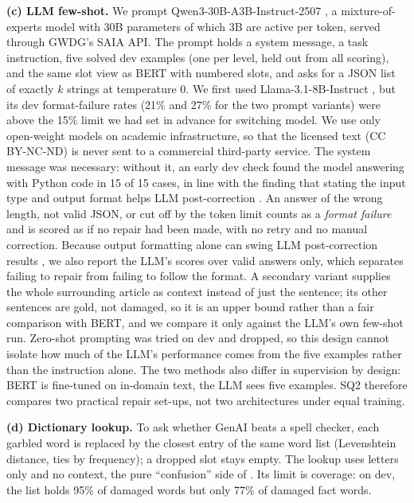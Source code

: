 \textbf{(c) LLM few-shot.} We prompt Qwen3-30B-A3B-Instruct-2507 \citep{yang2025qwen3}, a mixture-of-experts model
with 30B parameters of which 3B are active per token, served through GWDG's SAIA API. The prompt holds a system
message, a task instruction, five solved dev examples (one per level, held out from all scoring), and the same slot
view as BERT with numbered slots, and asks for a JSON list of exactly $k$ strings at temperature 0. We first used
Llama-3.1-8B-Instruct \citep{grattafiori2024llama3}, but its dev format-failure rates (21\% and 27\% for the two prompt variants) were above the 15\% limit
we had set in advance for switching model. We use only open-weight models on academic infrastructure, so that the
licensed \bln{} text (CC BY-NC-ND) is never sent to a commercial third-party service. The system message was necessary: without it, an early dev check found the model answering with Python code
in 15 of 15 cases, in line with the finding that stating the input type and output format helps
LLM post-correction \citep{boros2024postcorrection}. An answer of the wrong length, not valid JSON, or cut off by the
token limit counts as a \emph{format failure} and is scored as if no repair had been made, with no retry and no
manual correction. Because output formatting alone can swing LLM post-correction results
\citep{kanerva2025ocr}, we also report the LLM's scores over valid answers only, which separates failing to repair
from failing to follow the format. A secondary variant supplies the whole surrounding article as context instead of
just the sentence; its other sentences are gold, not damaged, so it is an upper bound rather than a fair comparison
with BERT, and we compare it only against the LLM's own few-shot run. Zero-shot prompting was tried on dev and
dropped, so this design cannot isolate how much of the LLM's performance comes from the five examples rather than
the instruction alone. The two methods also differ in supervision by design: BERT is fine-tuned on in-domain text,
the LLM sees five examples. SQ2 therefore compares two practical repair set-ups, not two architectures under equal
training.

\textbf{(d) Dictionary lookup.} To ask whether GenAI beats a spell checker, each garbled word is replaced by the
closest entry of the same word list (Levenshtein distance, ties by frequency); a dropped slot stays empty. The
lookup uses letters only and no context, the pure ``confusion'' side of \citet{evershed2014correcting}. Its limit is
coverage: on dev, the list holds 95\% of damaged words but only 77\% of damaged fact words.

